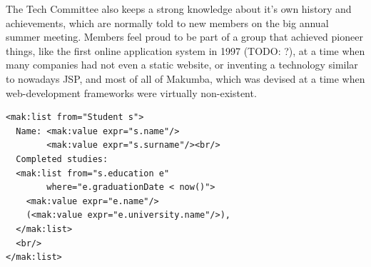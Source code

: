 \documentclass{acm_proc_article-sp}
\begin{document}
The Tech Committee also keeps a strong knowledge about it's own history and achievements, which are normally told to new members on the big annual summer meeting. Members feel proud to be part of a group that achieved pioneer things, like the first online application system in 1997 (TODO: ?), at a time when many companies had not even a static website, or inventing a technology similar to nowadays JSP, and most of all of Makumba, which was devised at a time when web-development frameworks were virtually non-existent.

\lstset{basicstyle=\small, captionpos=b, caption=Example of viewing data in Makumba, label=list:makumba, frame=shadowbox}
\begin{lstlisting}
<mak:list from="Student s">
  Name: <mak:value expr="s.name"/> 
        <mak:value expr="s.surname"/><br/>
  Completed studies:
  <mak:list from="s.education e"
  	    where="e.graduationDate < now()">
    <mak:value expr="e.name"/>
    (<mak:value expr="e.university.name"/>),
  </mak:list>
  <br/>
</mak:list>
\end{lstlisting}
\end{document}
